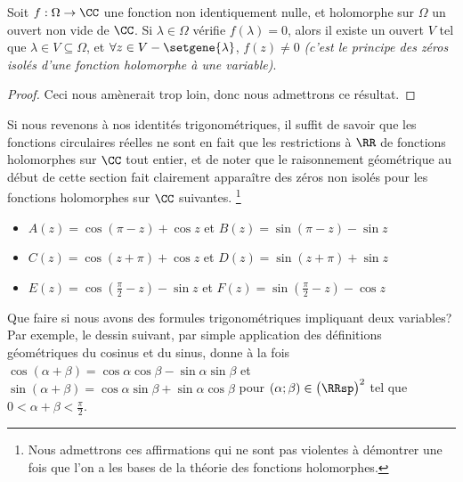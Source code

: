 \begin{fact} \label{holo-nullity}
    Soit $f: \Omega \rightarrow \CC$ une fonction non identiquement nulle, et holomorphe sur $\Omega$ un ouvert non vide de $\CC$.
	Si $\lambda \in \Omega$ vérifie $f(\lambda) = 0$,
	alors il existe un ouvert $V$ tel que 
	$\lambda \in V \subseteq \Omega$,
	et
	$\forall z \in V - \setgene{\lambda}$, $f(z) \neq 0$ 
	\emph{(c'est le principe des zéros isolés d'une fonction holomorphe à une variable)}. 
\end{fact}


\begin{proof}
	Ceci nous amènerait trop loin, donc nous admettrons ce résultat.
\end{proof}


Si nous revenons à nos identités trigonométriques, il suffit de savoir que les fonctions circulaires réelles ne sont en fait que les restrictions à $\RR$ de fonctions holomorphes sur $\CC$ tout entier, et de noter que le raisonnement géométrique au début de cette section fait clairement apparaître des zéros non isolés pour les fonctions holomorphes sur $\CC$ suivantes.%
\footnote{
	Nous admettrons ces affirmations qui ne sont pas violentes à démontrer une fois que l'on a les bases de la théorie des fonctions holomorphes.
}
%
\begin{itemize}[label=\small\textbullet]
	\item $A(z) = \cos (\pi - z) + \cos z$ 
	   et $B(z) =\sin (\pi - z) - \sin z$ 

	\smallskip
	\item $C(z) =\cos (z + \pi) + \cos z$ 
	   et $D(z) =\sin (z + \pi) + \sin z$

	\smallskip
	\item $E(z) =\cos \left( \frac{\pi}{2} - z \right) - \sin z$ 
	   et $F(z) =\sin \left( \frac{\pi}{2} - z \right) - \cos z$ 
\end{itemize}


Que faire si nous avons des formules trigonométriques impliquant deux variables? Par exemple, le dessin suivant, par simple application des définitions géométriques du cosinus et du sinus, donne à la fois
$\cos(\alpha + \beta) = \cos \alpha \cos \beta - \sin \alpha \sin \beta$
et
$\sin(\alpha + \beta) = \cos \alpha \sin \beta + \sin \alpha \cos \beta$
pour
$(\alpha ; \beta) \in \big( \RRsp \big)^2$ tel que $0 < \alpha + \beta < \frac{\pi}{2}$. 

\begin{center}
\end{center}

